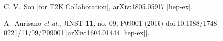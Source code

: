 \documentclass[a4 paper,12pt]{report}%
\begin{document}
\begin{thebibliography}{9}
  C. V.~Son [for T2K Collaboration],
  arXiv:1805.05917 [hep-ex].
  
  A.~Aurisano {\it et al.},
  JINST {\bf 11}, no. 09, P09001 (2016)
  doi:10.1088/1748-0221/11/09/P09001
  [arXiv:1604.01444 [hep-ex]].

\end{thebibliography}
 
\end{document}
